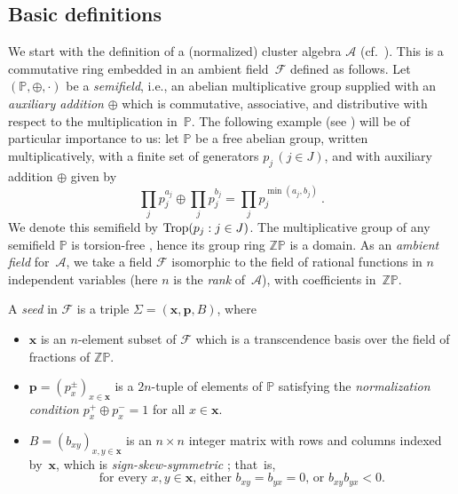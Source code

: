 \documentclass[letterpaper]{amsart}
\numberwithin{equation}{section}
\theoremstyle{definition}
\newtheorem{definition}[theorem]{Definition}
\def\AA{\mathcal{A}}
\def\ZZ{\mathbb{Z}}
\def\PP{\mathbb{P}}
\def\xx{\mathbf{x}}
\def\pp{\mathbf{p}}
\def\FFcal{\mathcal{F}}
\def\Trop{{\rm Trop}}
\begin{document}
\subsection{Basic definitions} 
\label{sec:def-of-normalized-ca} 
 
We start with 
the definition of a (normalized) cluster 
algebra $\AA$ (cf.~\cite[Sections~2 and~5]{fz-clust1}). 
This is a commutative ring embedded in an ambient field~$\FFcal$ 
defined as follows. 
Let $(\PP,\oplus, \cdot)$ be a \emph{semifield}, i.e., 
an abelian multiplicative group supplied with an \emph{auxiliary addition} 
$\oplus$ which is commutative, associative, and 
distributive with respect to the multiplication in~$\PP$. 
The following example (see \cite[Example~5.6]{fz-clust1}) will be of 
particular importance to us: 
let $\PP$ be a free abelian group, written multiplicatively, 
with a finite set of generators $p_j \, (j \in J)$, and with 
auxiliary addition $\oplus$ given by 
\begin{equation} 
\label{eq:tropical addition} 
\prod_j p_j^{a_j} \oplus \prod_j p_j^{b_j}  = 
\prod_j p_j^{\min (a_j, b_j)}  \ . 
\end{equation} 
We denote this semifield by $\Trop (p_j: j \in J)$. 
The multiplicative group of any semifield $\PP$ is torsion-free 
\cite[Section~5]{fz-clust1}, hence its group ring $\ZZ\PP$ is a 
domain. 
As an \emph{ambient field} for~$\AA$, we take a field $\FFcal$ 
isomorphic to the field of rational functions in $n$ independent 
variables 
(here $n$ is the \emph{rank} of~$\AA$), 
with coefficients in~$\ZZ \PP$. 
 
\pagebreak[2] 
 
A \emph{seed} in $\FFcal$ is a triple $\Sigma = (\xx, \pp, B)$, where 
 
\begin{itemize} 
 
\item $\xx$ is an $n$-element subset of $\FFcal$ which is a 
transcendence basis over the field of fractions of $\ZZ \PP$. 
 
\item $\pp = (p_x^\pm)_{x \in \xx}$ is a $2n$-tuple of elements of $\PP$ satisfying the 
\emph{normalization condition} 
$p_x^+ \oplus p_x^-  = 1$ for all $x \in \xx$. 
 
\item $B = (b_{xy})_{x,y \in \xx}$ is an $n\!\times\! n$ integer matrix 
with rows and columns indexed by~$\xx$, which is %
\emph{sign-skew-symmetric} \cite[Definition~4.1]{fz-clust1}; that~is, 
\begin{equation} 
\label{eq:sss} 
\text{for every $x,y \in \xx$, either $b_{xy} = b_{yx} = 0$, or 
$b_{xy} b_{yx} < 0$.} 
\end{equation} 
\end{itemize} 
 
\end{document}
